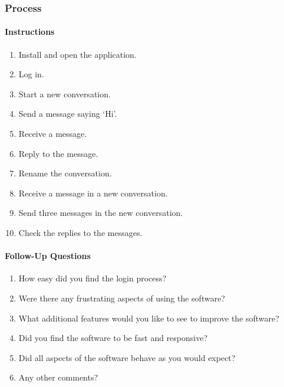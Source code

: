 \subsubsection{Process}

\paragraph{Instructions}
\begin{enumerate}
  \item Install and open the application.
  \item Log in.
  \item Start a new conversation.
  \item Send a message saying `Hi'.
  \item Receive a message.
  \item Reply to the message.
  \item Rename the conversation. 
  \item Receive a message in a new conversation.
  \item Send three messages in the new conversation.
  \item Check the replies to the messages.
\end{enumerate}


\paragraph{Follow-Up Questions}
\begin{enumerate}
  \item How easy did you find the login process?
  \item Were there any frustrating aspects of using the software?
  \item What additional features would you like to see to improve the software?
  \item Did you find the software to be fast and responsive?
  \item Did all aspects of the software behave as you would expect?
  \item Any other comments?
\end{enumerate}

